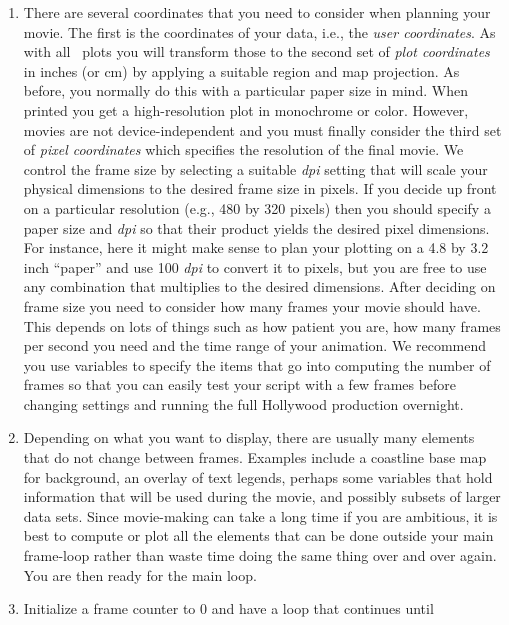 \let\oldenumi\labelenumi
\renewcommand{\labelenumi}{\textbf{\arabic{enumi}.}}
\begin{enumerate}
\item There are several coordinates that you need to consider when planning
your movie.  The first is the coordinates of your data, i.e., the \emph{user
coordinates}.  As with all \GMT\ plots you will transform those to the
second set of \emph{plot coordinates} 
in inches (or cm) by applying a suitable region and map projection.  As
before, you normally do this with a particular paper size in mind.  When
printed you get a high-resolution plot in monochrome or color.
However, movies are not device-independent and you must finally consider
the third set of \emph{pixel coordinates} which specifies the resolution of the final movie.
We control the frame size by selecting a suitable {\it dpi} setting that
will scale your physical dimensions to the desired frame size in pixels.
If you decide up front on a particular resolution (e.g., 480 by 320 pixels)
then you should specify a paper size and {\it dpi} so that their product yields the desired pixel dimensions.
For instance, here it might make sense to plan your plotting on a 4.8 by 3.2 inch ``paper''
and use 100 {\it dpi} to convert it to pixels, but you are free to use any combination
that multiplies to the desired dimensions.  After deciding on frame size you need
to consider how many frames your movie should have.  This depends on lots of things
such as how patient you are, how many frames per second you need and the time
range of your animation.  We recommend you use variables to specify the items that
go into computing the number of frames so that you can easily test your script
with a few frames before changing settings and running the full Hollywood production overnight.
\item Depending on what you want to display, there are usually many elements that
do not change between frames.  Examples include a coastline base map for background,
an overlay of text legends, perhaps some variables that hold information that will
be used during the movie, and possibly subsets of larger data sets.  Since movie-making
can take a long time if you are ambitious, it is best to compute or plot all the
elements that can be done outside your main frame-loop rather than waste time
doing the same thing over and over again.  You are then ready for the main loop.
\item Initialize a frame counter to 0 and have a loop that continues until

\end{enumerate}
